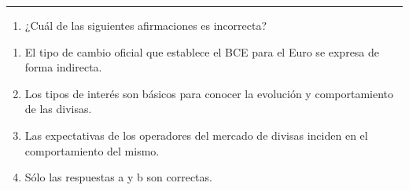 \documentclass[
  letterpaper,
  DIV=11,
  numbers=noendperiod]{scrreprt}
\providecommand{\tightlist}{%
  \setlength{\itemsep}{0pt}\setlength{\parskip}{0pt}}\usepackage{longtable,booktabs,array}
\begin{document}
\begin{center}\rule{0.5\linewidth}{0.5pt}\end{center}

\begin{enumerate}
\def\labelenumi{\arabic{enumi}.}
\setcounter{enumi}{45}
\tightlist
\item
  ¿Cuál de las siguientes afirmaciones es incorrecta?
\end{enumerate}

\begin{enumerate}
\def\labelenumi{\alph{enumi}.}
\item
  El tipo de cambio oficial que establece el BCE para el Euro se expresa
  de forma indirecta.
\item
  Los tipos de interés son básicos para conocer la evolución y
  comportamiento de las divisas.
\item
  Las expectativas de los operadores del mercado de divisas inciden en
  el comportamiento del mismo.
\item
  Sólo las respuestas a y b son correctas.
\end{enumerate}
\end{document}
